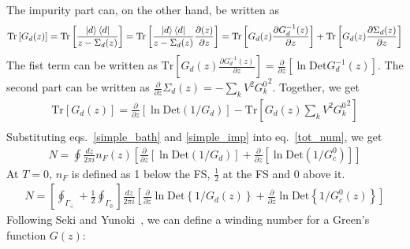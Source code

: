 \documentclass{report}
\numberwithin{equation}{section}
\begin{document}
The impurity part can, on the other hand, be written as
\begin{equation}\begin{aligned}
	\label{self_id}
	\text{Tr}\left[G_{d}(z)\right] &= \text{Tr}\left[ \frac{\ket{d}\bra{d}}{z - \Sigma_d(z)}\right] = \text{Tr}\left[ \frac{\ket{d}\bra{d}}{z - \Sigma_d(z)}\frac{\partial{\left(z\right)}}{\partial{z}} \right] = \text{Tr}\left[ G_{d}(z)\frac{\partial{G_{d}^{-1}(z)}}{\partial{z}} \right] + \text{Tr}\left[ G_{d}(z)\frac{\partial{\Sigma_d(z)}}{\partial{z}} \right]\\
\end{aligned}\end{equation}
The fist term can be written as \(\text{Tr}\left[ G_{d}(z)\frac{\partial{G_{d}^{-1}(z)}}{\partial{z}} \right] = \frac{\partial{}}{\partial{z}}\left[\ln \text{Det}G_{d}^{-1}(z)\right]\). The second part can be written as \(\frac{\partial{}}{\partial{z}}{\Sigma_d(z)} = -\sum_k V^2 {G_k^0}^2\). Together, we get
\begin{equation}\begin{aligned}
	\label{simple_imp}
	\text{Tr}\left[G_{d}(z)\right] = \frac{\partial{}}{\partial{z}}\left[\ln \text{Det}\left(1/G_{d}\right)\right] - \text{Tr}\left[ G_{d}(z)\sum_k V^2 {G_k^0}^2\right]\\
\end{aligned}\end{equation}
Substituting eqs.~\ref{simple_bath} and \ref{simple_imp} into eq.~\ref{tot_num}, we get
\begin{equation}\begin{aligned}
	N = \oint \frac{dz}{2\pi i}n_F(z) \left[\frac{\partial{}}{\partial{z}}\left[\ln \text{Det}\left(1/G_{d}\right)\right] + \frac{\partial{}}{\partial{z}}\left[\ln \text{Det}\left(1/G_{c}^{0}\right)\right]\right]
\end{aligned}\end{equation}
At \(T=0\), \(n_F\) is defined as 1 below the FS, \(\frac{1}{2}\) at the FS and 0 above it.
\begin{equation}\begin{aligned}
N  = \left[\oint_{\Gamma_<} + \frac{1}{2}\oint_{\Gamma_0}\right]\frac{dz}{2\pi i}\left[\frac{\partial{}}{\partial{z}} \ln \text{Det} \left\{1/G_d(z)\right\} + \frac{\partial{}}{\partial{z}} \ln \text{Det} \left\{1/G_{c}^{0}(z)\right\} \right]
\end{aligned}\end{equation}
Following Seki and Yunoki~\cite{seki2017topological}, we can define a winding number for a Green's function \(G(z)\):
\end{document}
